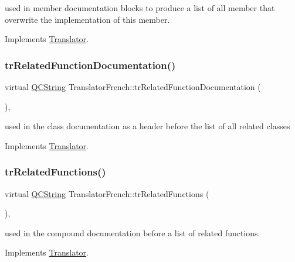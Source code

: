 used in member documentation blocks to produce a list of all member that overwrite the implementation of this member. 

Implements \mbox{\hyperlink{class_translator}{Translator}}.

\mbox{\label{class_translator_french_a7d67601512e0c338ed472e0a70b04747}} 
\subsubsection{\texorpdfstring{trRelatedFunctionDocumentation()}{trRelatedFunctionDocumentation()}}
{\footnotesize\ttfamily virtual \mbox{\hyperlink{class_q_c_string}{Q\+C\+String}} Translator\+French\+::tr\+Related\+Function\+Documentation (\begin{DoxyParamCaption}{ }\end{DoxyParamCaption})\hspace{0.3cm}{\ttfamily [inline]}, {\ttfamily [virtual]}}

used in the class documentation as a header before the list of all related classes 

Implements \mbox{\hyperlink{class_translator}{Translator}}.

\mbox{\label{class_translator_french_a397116fad6dd70110bf3a0aef49b10d7}} 
\subsubsection{\texorpdfstring{trRelatedFunctions()}{trRelatedFunctions()}}
{\footnotesize\ttfamily virtual \mbox{\hyperlink{class_q_c_string}{Q\+C\+String}} Translator\+French\+::tr\+Related\+Functions (\begin{DoxyParamCaption}{ }\end{DoxyParamCaption})\hspace{0.3cm}{\ttfamily [inline]}, {\ttfamily [virtual]}}

used in the compound documentation before a list of related functions. 

Implements \mbox{\hyperlink{class_translator}{Translator}}.

